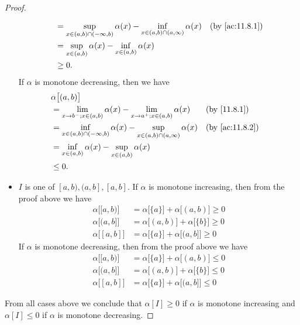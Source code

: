 \begin{proof}
\begin{itemize}
\begin{align*}
             & = \sup_{x \in (a, b) \cap (-\infty, b)} \alpha(x) - \inf_{x \in (a, b) \cap (a, \infty)} \alpha(x) &  & \text{(by \cref{ac:11.8.1})} \\
             & = \sup_{x \in (a, b)} \alpha(x) - \inf_{x \in (a, b)} \alpha(x)                                                                      \\
             & \geq 0.
          \end{align*}
          If \(\alpha\) is monotone decreasing, then we have
          \begin{align*}
             & \alpha\big[(a, b)\big]                                                                                                               \\
             & = \lim_{x \to b^- ; x \in (a, b)} \alpha(x) - \lim_{x \to a^+ ; x \in (a, b)} \alpha(x)            &  & \text{(by \cref{11.8.1})}    \\
             & = \inf_{x \in (a, b) \cap (-\infty, b)} \alpha(x) - \sup_{x \in (a, b) \cap (a, \infty)} \alpha(x) &  & \text{(by \cref{ac:11.8.2})} \\
             & = \inf_{x \in (a, b)} \alpha(x) - \sup_{x \in (a, b)} \alpha(x)                                                                      \\
             & \leq 0.
          \end{align*}
    \item \(I\) is one of \([a, b), (a, b], [a, b]\).
          If \(\alpha\) is monotone increasing, then from the proof above we have
          \begin{align*}
            \alpha\big[[a, b)\big] & = \alpha\big[\{a\}\big] + \alpha\big[(a, b)\big] \geq 0 \\
            \alpha\big[(a, b]\big] & = \alpha\big[(a, b)\big] + \alpha\big[\{b\}\big] \geq 0 \\
            \alpha\big[[a, b]\big] & = \alpha\big[\{a\}\big] + \alpha\big[(a, b]\big] \geq 0
          \end{align*}
          If \(\alpha\) is monotone decreasing, then from the proof above we have
          \begin{align*}
            \alpha\big[[a, b)\big] & = \alpha\big[\{a\}\big] + \alpha\big[(a, b)\big] \leq 0 \\
            \alpha\big[(a, b]\big] & = \alpha\big[(a, b)\big] + \alpha\big[\{b\}\big] \leq 0 \\
            \alpha\big[[a, b]\big] & = \alpha\big[\{a\}\big] + \alpha\big[(a, b]\big] \leq 0
          \end{align*}
  \end{itemize}
  From all cases above we conclude that \(\alpha[I] \geq 0\) if \(\alpha\) is monotone increasing and \(\alpha[I] \leq 0\) if \(\alpha\) is monotone decreasing.
\end{proof}


